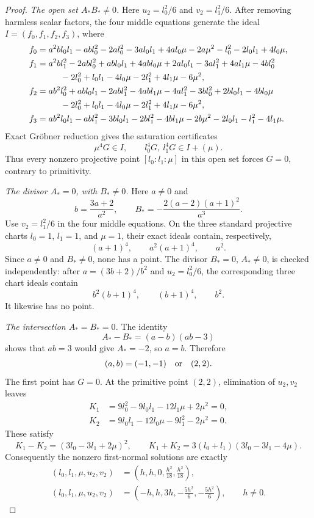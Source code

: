\begin{proof}
\smallskip
\noindent\emph{The open set $A_*B_*\ne0$.}
Here $u_2=l_0^2/6$ and $v_2=l_1^2/6$.  After removing harmless scalar
factors, the four middle equations generate the ideal $I=(f_0,f_1,f_2,f_3)$,
where
\begin{align*}
 f_0={}&a^2bl_0l_1-abl_0^2-2al_0^2-3al_0l_1+4al_0\mu-2a\mu^2
        -l_0^2-2l_0l_1+4l_0\mu,\\
 f_1={}&a^2bl_1^2-2abl_0^2+abl_0l_1+4abl_0\mu+2al_0l_1-3al_1^2
        +4al_1\mu-4bl_0^2\\
      &\hspace{1.4em}-2l_0^2+l_0l_1-4l_0\mu-2l_1^2+4l_1\mu-6\mu^2,\\
 f_2={}&ab^2l_0^2+abl_0l_1-2abl_1^2-4abl_1\mu-4al_1^2-3bl_0^2
        +2bl_0l_1-4bl_0\mu\\
      &\hspace{1.4em}-2l_0^2+l_0l_1-4l_0\mu-2l_1^2+4l_1\mu-6\mu^2,\\
 f_3={}&ab^2l_0l_1-abl_1^2-3bl_0l_1-2bl_1^2-4bl_1\mu-2b\mu^2
        -2l_0l_1-l_1^2-4l_1\mu.
\end{align*}
Exact Gröbner reduction gives the saturation certificates
\begin{equation}
\label{eq:tau-minus-one-saturation}
 \mu^4G\in I,
 \qquad
 l_0^4G,\ l_1^4G\in I+(\mu).
\end{equation}
Thus every nonzero projective point $[l_0:l_1:\mu]$ in this open set
forces $G=0$, contrary to primitivity.

\smallskip
\noindent\emph{The divisor $A_*=0$, with $B_*\ne0$.}
Here $a\ne0$ and
\[
 b=\frac{3a+2}{a^2},\qquad
 B_*=-\frac{2(a-2)(a+1)^2}{a^3}.
\]
Use $v_2=l_1^2/6$ in the four middle equations.  On the three standard
projective charts $l_0=1$, $l_1=1$, and $\mu=1$, their exact ideals contain,
respectively,
\[
 (a+1)^4,\qquad a^2(a+1)^4,\qquad a^2.
\]
Since $a\ne0$ and $B_*\ne0$, none has a point.  The divisor $B_*=0$,
$A_*\ne0$, is checked independently: after
$a=(3b+2)/b^2$ and $u_2=l_0^2/6$, the corresponding three chart ideals
contain
\[
 b^2(b+1)^4,\qquad (b+1)^4,\qquad b^2.
\]
It likewise has no point.

\smallskip
\noindent\emph{The intersection $A_*=B_*=0$.}
The identity
\[
 A_*-B_*=(a-b)(ab-3)
\]
shows that $ab=3$ would give $A_*=-2$, so $a=b$.  Therefore
\[
 (a,b)=(-1,-1)\quad\hbox{or}\quad (2,2).
\]
The first point has $G=0$.  At the primitive point $(2,2)$, elimination of
$u_2,v_2$ leaves
\begin{align*}
 K_1&=9l_0^2-9l_0l_1-12l_1\mu+2\mu^2=0,\\
 K_2&=9l_0l_1-12l_0\mu-9l_1^2-2\mu^2=0.
\end{align*}
These satisfy
\[
 K_1-K_2=(3l_0-3l_1+2\mu)^2,
 \qquad
 K_1+K_2=3(l_0+l_1)(3l_0-3l_1-4\mu).
\]
Consequently the nonzero first-normal solutions are exactly
\begin{align*}
 (l_0,l_1,\mu,u_2,v_2)
   &=\left(h,h,0,\frac{h^2}{18},\frac{h^2}{18}\right),\\
 (l_0,l_1,\mu,u_2,v_2)
   &=\left(-h,h,3h,-\frac{5h^2}{6},-\frac{5h^2}{6}\right),
 \qquad h\ne0.
\end{align*}


\end{proof}

